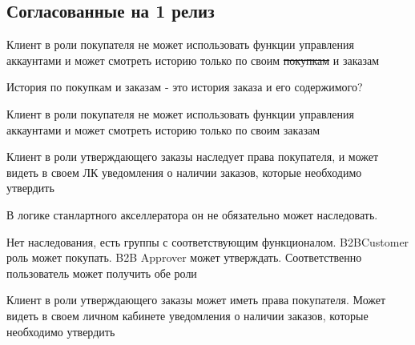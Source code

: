 \subsection{Согласованные на 1 релиз}
\fi
{}
{

\begin{wiki}
Клиент в роли покупателя не может использовать функции управления аккаунтами и может смотреть историю только по своим \sout{покупкам} и заказам
\end{wiki}

\begin{hybris}
История по покупкам и заказам - это история заказа и его содержимого?
\end{hybris}


\begin{itogo}
Клиент в роли покупателя не может использовать функции управления аккаунтами и может смотреть историю только по своим заказам
\end{itogo}



}
{


\begin{wiki}
Клиент в роли утверждающего заказы наследует права покупателя, и может видеть в своем ЛК уведомления о наличии заказов, которые необходимо утвердить
\end{wiki}

\begin{teamidea}
В логике станлартного акселлератора он не обязательно может наследовать.
\end{teamidea}

\begin{hybris}
Нет наследования, есть группы с соответствующим функционалом. B2BCustomer роль может покупать. B2B Approver может утверждать. Соответственно пользователь может получить обе роли
\end{hybris}


\begin{itogo}
Клиент в роли утверждающего заказы может иметь права покупателя. Может видеть в своем личном кабинете уведомления о наличии заказов, которые необходимо утвердить
\end{itogo}



}
